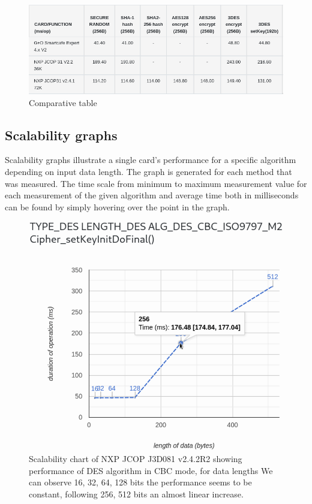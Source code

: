\begin{figure}[h]
    \centering
    \includegraphics[width=\textwidth]{img/comparative-table.png}
    \caption{Comparative table}
    \label{fig:comparative-table}
\end{figure}

\subsection{Scalability graphs}
Scalability graphs illustrate a single card's performance for a specific algorithm depending on input data length. The graph is generated for each method that was measured. The time scale from minimum to maximum measurement value for each measurement of the given algorithm and average time both in milliseconds can be found by simply hovering over the point in the graph.

\begin{figure}[H]
    \centering  
    \includegraphics[width=\textwidth-3.5cm]{img/NXP_JCOP_J3D081_v2.4.2R2 scalability graph.png}
    \caption{
    Scalability chart of NXP JCOP J3D081 v2.4.2R2 showing performance of DES algorithm in CBC mode, for data lengths We can observe 16, 32, 64, 128 bits the performance seems to be constant, following 256, 512 bits an almost linear increase.
    }
    \label{fig:scalability-chart}
\end{figure}

